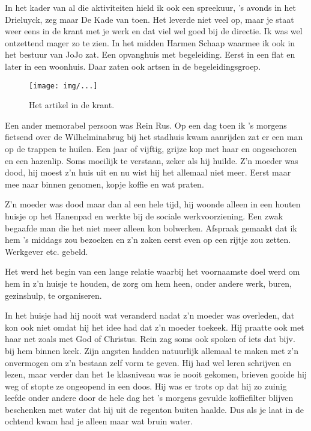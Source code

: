 \documentclass[10pt,twoside,openright]{memoir}
\begin{document}
In het kader van al die aktiviteiten hield ik ook een spreekuur, 's avonds in het Drieluyck, zeg maar De Kade van toen. Het leverde niet veel op, maar je staat weer eens in de krant met je werk en dat viel wel goed bij de directie. 
Ik was wel ontzettend mager zo te zien. In het midden Harmen Schaap waarmee ik ook in het bestuur van JoJo zat. Een opvanghuis met begeleiding. Eerst in een flat en later in een woonhuis. Daar zaten ook artsen in de begeleidingsgroep.

\begin{figure}[t]
\texttt{[image: img/...]}
\caption{Het artikel in de krant.}
\end{figure}

Een ander memorabel persoon was Rein Rus. Op een dag toen ik ’s morgens fietsend over de Wilhelminabrug bij het stadhuis kwam aanrijden zat er een man op de trappen te huilen. Een jaar of vijftig, grijze kop met haar en ongeschoren en een hazenlip. Soms moeilijk te verstaan, zeker als hij huilde. Z’n moeder was dood, hij moest z’n huis uit en nu wist hij het allemaal niet meer. Eerst maar mee naar binnen genomen, kopje koffie en wat praten. 

Z’n moeder was dood maar dan al een hele tijd, hij woonde alleen in een houten huisje op het Hanenpad en werkte bij de sociale werkvoorziening. Een zwak begaafde man die het niet meer alleen kon bolwerken. Afspraak gemaakt dat ik hem ’s middags zou bezoeken en z’n zaken eerst even op een rijtje zou zetten. Werkgever etc. gebeld. 

Het werd het begin van een lange relatie waarbij het voornaamste doel werd om hem in z’n huisje te houden, de zorg om hem heen, onder andere werk, buren, gezinshulp, te organiseren. 

In het huisje had hij nooit wat veranderd nadat z’n moeder was overleden, dat kon ook niet omdat hij het idee had dat z’n moeder toekeek. Hij praatte ook met haar net zoals met God of Christus. Rein zag soms ook spoken of iets dat bijv. bij hem binnen keek. Zijn angsten hadden natuurlijk allemaal te maken met z’n onvermogen om z’n bestaan zelf vorm te geven. Hij had wel leren schrijven en lezen, maar verder dan het 1e klasniveau was ie nooit gekomen, brieven gooide hij weg of stopte ze ongeopend in een doos. Hij was er trots op dat hij zo zuinig leefde onder andere door de hele dag het ’s morgens gevulde koffiefilter blijven beschenken met water dat hij uit de regenton buiten haalde. Dus als je laat in de ochtend kwam had je alleen maar wat bruin water. 
\end{document}
